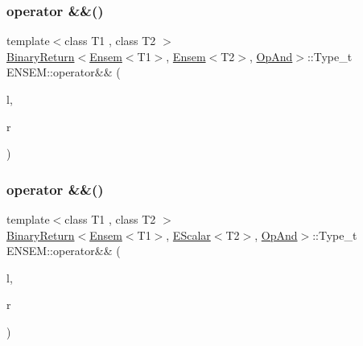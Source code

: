 \mbox{\label{namespaceENSEM_ga1a9761f53df3f59110335a2a8cf2d67c}} 
\subsubsection{\texorpdfstring{operator \&\&()}{operator \&\&()}\hspace{0.1cm}{\footnotesize\ttfamily [5/7]}}
{\footnotesize\ttfamily template$<$class T1 , class T2 $>$ \\
\mbox{\hyperlink{structENSEM_1_1BinaryReturn}{Binary\+Return}}$<$\mbox{\hyperlink{classENSEM_1_1Ensem}{Ensem}}$<$T1$>$, \mbox{\hyperlink{classENSEM_1_1Ensem}{Ensem}}$<$T2$>$, \mbox{\hyperlink{structENSEM_1_1OpAnd}{Op\+And}}$>$\+::Type\+\_\+t E\+N\+S\+E\+M\+::operator\&\& (\begin{DoxyParamCaption}\item[{const \mbox{\hyperlink{classENSEM_1_1Ensem}{Ensem}}$<$ T1 $>$ \&}]{l,  }\item[{const \mbox{\hyperlink{classENSEM_1_1Ensem}{Ensem}}$<$ T2 $>$ \&}]{r }\end{DoxyParamCaption})\hspace{0.3cm}{\ttfamily [inline]}}

\mbox{\label{namespaceENSEM_ga00415a6169d18f80656be828f11a157b}} 
\subsubsection{\texorpdfstring{operator \&\&()}{operator \&\&()}\hspace{0.1cm}{\footnotesize\ttfamily [6/7]}}
{\footnotesize\ttfamily template$<$class T1 , class T2 $>$ \\
\mbox{\hyperlink{structENSEM_1_1BinaryReturn}{Binary\+Return}}$<$\mbox{\hyperlink{classENSEM_1_1Ensem}{Ensem}}$<$T1$>$, \mbox{\hyperlink{classENSEM_1_1EScalar}{E\+Scalar}}$<$T2$>$, \mbox{\hyperlink{structENSEM_1_1OpAnd}{Op\+And}}$>$\+::Type\+\_\+t E\+N\+S\+E\+M\+::operator\&\& (\begin{DoxyParamCaption}\item[{const \mbox{\hyperlink{classENSEM_1_1Ensem}{Ensem}}$<$ T1 $>$ \&}]{l,  }\item[{const \mbox{\hyperlink{classENSEM_1_1EScalar}{E\+Scalar}}$<$ T2 $>$ \&}]{r }\end{DoxyParamCaption})\hspace{0.3cm}{\ttfamily [inline]}}

